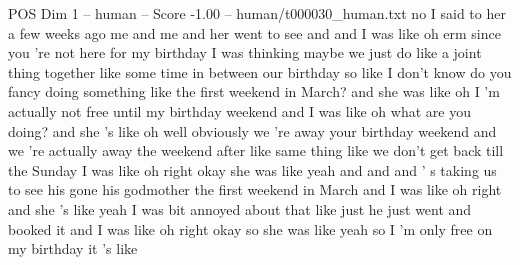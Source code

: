 \begin{textsample}{POS Dim 1 – human – Score -1.00 – human/t000030\_human.txt}  \label{ex:f1_pos_015}
no I said to her a few weeks ago me and me and her went to see and and I was like oh erm since you 're not here for my birthday I was thinking maybe we just do like a joint thing together like some time in between our birthday so like I don't know do you fancy doing something like the first weekend in March? and she was like oh I 'm actually not free until my birthday weekend and I was like oh what are you doing? and she 's like oh well obviously we 're away your birthday weekend and we 're actually away the weekend after like same thing like we don't get back till the Sunday I was like oh right okay she was like yeah and and and ' s taking us to see his gone his godmother the first weekend in March and I was like oh right and she 's like yeah I was bit annoyed about that like just he just went and booked it and I was like oh right okay so she was like yeah so I 'm only free on my birthday it 's like

\end{textsample}
